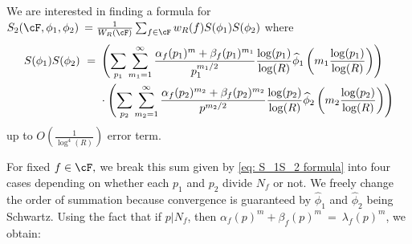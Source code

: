 \documentclass[11pt, reqno]{amsart}
\theoremstyle{definition}
\theoremstyle{remark}
\numberwithin{equation}{section}
\renewcommand{\hat}{\widehat}
\begin{document}
We are interested in finding a formula for $S_2(\cF,\phi_1,\phi_2)\:=\frac{1}{W_R(\cF)}\sum_{f\in \cF}w_R(f)S(\phi_1)S(\phi_2)$ where
\begin{align} \label{eq: S_1S_2 formula}
    S(\phi_1)S(\phi_2) \ = \  &\left(\sum_{p_1}\sum_{m_1=1}^\infty \frac{\alpha_f(p_1)^{m}+\beta_f(p_1)^{m_1}}{p_1^{m_1/2}} \frac{\log(p_1)}{\log(R)} \hat\phi_1\left(m_1 \frac{\log(p_1)}{\log(R)}\right)\right)\notag\\&\cdot \left(\sum_{p_2}\sum_{m_2=1}^\infty \frac{\alpha_f(p_2)^{m_2}+\beta_f(p_2)^{m_2}}{p^{m_2/2}} \frac{\log(p_2)}{\log(R)} \hat\phi_2\left(m_2 \frac{\log(p_2)}{\log(R)}\right)\right)
\end{align} up to $O\left(\frac{1}{\log^4(R)}\right)$ error term.

For fixed $f \in \cF,$ we break this sum given by \eqref{eq: S_1S_2 formula} into four cases depending on whether each $p_1$ and $p_2$ divide $N_f$ or not. We freely change the order of summation because convergence is guaranteed by $\hat\phi_1$ and $\hat\phi_2$ being Schwartz. Using the fact that if $p|N_f$, then $\alpha_f(p)^m+\beta_f(p)^m\ = \ \lambda_f(p)^m$, we obtain: 
\end{document}
